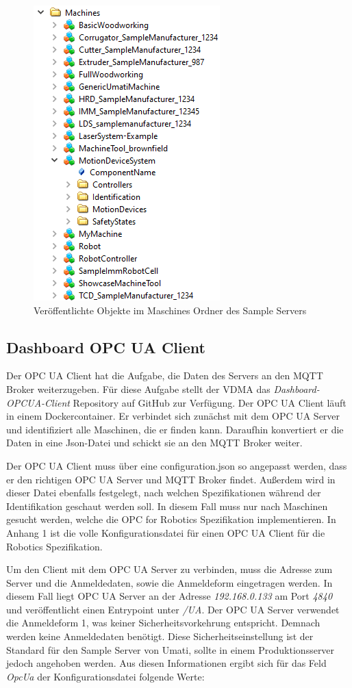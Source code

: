 \documentclass[a4paper, 12pt, oneside, toc=listofnumbered, bibliography=totoc]{scrbook}
\begin{document}
		\begin{figure}[H]
			\centering
			\includegraphics[height=0.7\linewidth]{res/UAExpert.png}
			\caption{Veröffentlichte Objekte im Maschines Ordner des Sample Servers}
			\label{fig:UAExpert}
		\end{figure}
		
		\subsection{Dashboard OPC UA Client}\label{ch:OPCClient}
		
		Der OPC UA Client hat die Aufgabe, die Daten des Servers an den MQTT Broker weiterzugeben. Für diese Aufgabe stellt der VDMA das \textit{Dashboard-OPCUA-Client} Repository auf GitHub zur Verfügung. Der OPC UA Client läuft in einem Dockercontainer. Er verbindet sich zunächst mit dem OPC UA Server und identifiziert alle Maschinen, die er finden kann. Daraufhin konvertiert er die Daten in eine Json-Datei und schickt sie an den MQTT Broker weiter.
		
		Der OPC UA Client muss über eine configuration.json so angepasst werden, dass er den richtigen OPC UA Server und MQTT Broker findet. Außerdem wird in dieser Datei ebenfalls festgelegt, nach welchen Spezifikationen während der Identifikation geschaut werden soll. In diesem Fall muss nur nach Maschinen gesucht werden, welche die OPC for Robotics Spezifikation implementieren. In Anhang 1 ist die volle Konfigurationsdatei für einen OPC UA Client für die Robotics Spezifikation.
		
		Um den Client mit dem OPC UA Server zu verbinden, muss die Adresse zum Server und die Anmeldedaten, sowie die Anmeldeform eingetragen werden. In diesem Fall liegt OPC UA Server an der Adresse \textit{192.168.0.133} am Port \textit{4840} und veröffentlicht einen Entrypoint unter \textit{/UA}. Der OPC UA Server verwendet die Anmeldeform 1, was keiner Sicherheitsvorkehrung entspricht. Demnach werden keine Anmeldedaten benötigt. Diese Sicherheitseinstellung ist der Standard für den Sample Server von Umati, sollte in einem Produktionsserver jedoch angehoben werden. Aus diesen Informationen ergibt sich für das Feld \textit{OpcUa} der Konfigurationsdatei folgende Werte:
		
\end{document}
